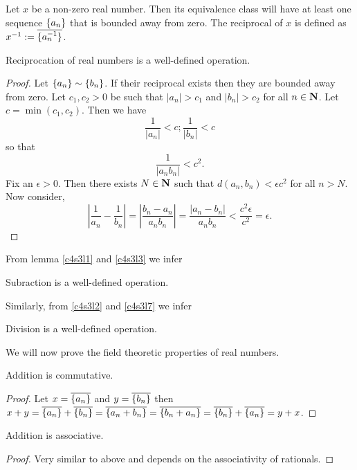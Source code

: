 \begin{defn}\label{c4s3d7}
Let $x$ be a non-zero real number. Then its equivalence class will have
at least one sequence $\{a_n\}$ that is bounded away from zero. The
reciprocal of $x$ is defined as $x^{-1} := \overline{\{a_n^{-1}\}}$.
\end{defn}

\begin{lem}\label{c4s3l7}
Reciprocation of real numbers is a well-defined operation.
\end{lem}
\begin{proof}
Let $\{a_n\} \sim \{b_n\}$. If their reciprocal exists then they
are bounded away from zero. Let $c_1, c_2 > 0$ be such that $|a_n| > c_1$
and $|b_n| > c_2$ for all $n \in \mathbf{N}$. Let $c = \min(c_1, c_2)$. Then
we have 
\[
\frac{1}{|a_n|} < c; \frac{1}{|b_n|} < c
\]
so that
\[
\frac{1}{|a_nb_n|} < c^2.
\]
Fix an $\epsilon > 0$. Then there exists $N \in \mathbf{N}$ such that $d(a_n,
b_n) < \epsilon c^2$ for all $n > N$. Now consider,
\[
\left|\frac{1}{a_n} - \frac{1}{b_n}\right| = \left|\frac{b_n - a_n}{a_nb_n}
\right| = \frac{|a_n - b_n|}{a_nb_n} < \frac{c^2\epsilon}{c^2} = 
\epsilon.
\]
\end{proof}

From lemma \ref{c4s3l1} and \ref{c4s3l3} we infer
\begin{lem}\label{c4s3l8}
Subraction is a well-defined operation.
\end{lem}

Similarly, from \ref{c4s3l2} and \ref{c4s3l7} we infer
\begin{lem}\label{c4s3l9}
Division is a well-defined operation.
\end{lem}

We will now prove the field theoretic properties of real numbers.
\begin{lem}\label{c4s3l10}
Addition is commutative.
\end{lem}
\begin{proof}
Let $x = \overline{\{a_n\}}$ and $y = \overline{\{b_n\}}$ then $x + y
= \overline{\{a_n\}} + \overline{\{b_n\}} = \overline{\{a_n+b_n\}}
= \overline{\{b_n + a_n\}} = \overline{\{b_n\}} + \overline{\{a_n\}}
= y + x$.
\end{proof}

\begin{lem}\label{c4s3l11}
Addition is associative.
\end{lem}
\begin{proof}
Very similar to above and depends on the associativity of rationals.
\end{proof}

